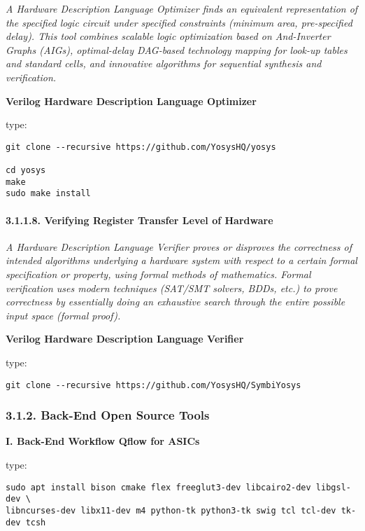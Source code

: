 \documentclass[]{article}
\let\oldparagraph\paragraph
\renewcommand{\paragraph}[1]{\oldparagraph{#1}\mbox{}}
\begin{document}
\emph{A Hardware Description Language Optimizer finds an equivalent
representation of the specified logic circuit under specified
constraints (minimum area, pre-specified delay). This tool combines
scalable logic optimization based on And-Inverter Graphs (AIGs),
optimal-delay DAG-based technology mapping for look-up tables and
standard cells, and innovative algorithms for sequential synthesis and
verification.}

\textbf{Verilog Hardware Description Language Optimizer}

type:

\begin{verbatim}
git clone --recursive https://github.com/YosysHQ/yosys

cd yosys
make
sudo make install
\end{verbatim}

\paragraph{3.1.1.8. Verifying Register Transfer Level of
Hardware}\label{verifying-register-transfer-level-of-hardware}

\emph{A Hardware Description Language Verifier proves or disproves the
correctness of intended algorithms underlying a hardware system with
respect to a certain formal specification or property, using formal
methods of mathematics. Formal verification uses modern techniques
(SAT/SMT solvers, BDDs, etc.) to prove correctness by essentially doing
an exhaustive search through the entire possible input space (formal
proof).}

\textbf{Verilog Hardware Description Language Verifier}

type:

\begin{verbatim}
git clone --recursive https://github.com/YosysHQ/SymbiYosys
\end{verbatim}

\subsubsection{3.1.2. Back-End Open Source
Tools}\label{back-end-open-source-tools}

\textbf{I. Back-End Workflow Qflow for ASICs}

type:

\begin{verbatim}
sudo apt install bison cmake flex freeglut3-dev libcairo2-dev libgsl-dev \
libncurses-dev libx11-dev m4 python-tk python3-tk swig tcl tcl-dev tk-dev tcsh
\end{verbatim}
\end{document}
